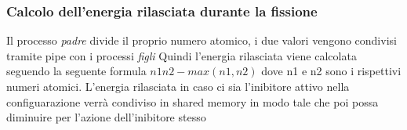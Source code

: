 \subsubsection{Calcolo dell'energia rilasciata durante la fissione}
Il processo \textit{padre} divide il proprio numero atomico, i due valori vengono condivisi tramite pipe con i processi \textit{figli}
Quindi l'energia rilasciata viene calcolata seguendo la seguente formula $n1n2-max(n1,n2)$ dove n1 e n2 sono i rispettivi numeri atomici.
L'energia rilasciata in caso ci sia l'inibitore attivo nella configuarazione verrà condiviso in shared memory in modo tale che poi possa diminuire per l'azione dell'inibitore stesso

